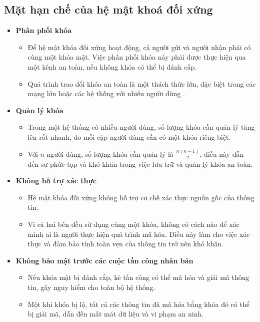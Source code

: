 \subsection{ Mặt hạn chế của hệ mật khoá đối xứng}
\begin{itemize}
    \item \textbf{Phân phối khóa}
    \begin{itemize}
        \item  Để hệ mật khóa đối xứng hoạt động, cả người gửi và người nhận phải có cùng một khóa mật. Việc phân phối khóa này phải được thực hiện qua một kênh an toàn, nếu không khóa có thể bị đánh cắp.
        \item Quá trình trao đổi khóa an toàn là một thách thức lớn, đặc biệt trong các mạng lớn hoặc các hệ thống với nhiều người dùng \cite{alenezi2020symmetric}.
    \end{itemize}

    \item \textbf{Quản lý khóa}
    \begin{itemize}
        \item Trong một hệ thống có nhiều người dùng, số lượng khóa cần quản lý tăng lên rất nhanh, do mỗi cặp người dùng cần có một khóa riêng biệt.
        \item  Với \( n \) người dùng, số lượng khóa cần quản lý là \( \frac{n(n-1)}{2} \), điều này dẫn đến sự phức tạp và khó khăn trong việc lưu trữ và quản lý khóa an toàn.
    \end{itemize}

    \item \textbf{Không hỗ trợ xác thực}
    \begin{itemize}
        \item  Hệ mật khóa đối xứng không hỗ trợ cơ chế xác thực nguồn gốc của thông tin.
        \item Vì cả hai bên đều sử dụng cùng một khóa, không có cách nào để xác minh ai là người thực hiện quá trình mã hóa. Điều này làm cho việc xác thực và đảm bảo tính toàn vẹn của thông tin trở nên khó khăn.
    \end{itemize}

    \item \textbf{Không bảo mật trước các cuộc tấn công nhân bản}
    \begin{itemize}
        \item Nếu khóa mật bị đánh cắp, kẻ tấn công có thể mã hóa và giải mã thông tin, gây nguy hiểm cho toàn bộ hệ thống.
        \item Một khi khóa bị lộ, tất cả các thông tin đã mã hóa bằng khóa đó có thể bị giải mã, dẫn đến mất mát dữ liệu và vi phạm an ninh.
    \end{itemize}


\end{itemize}
